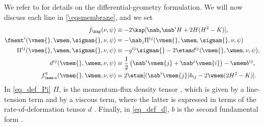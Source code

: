 We refer to \cite{desernoFluidLipidMembranes2015,worthmullerIRENEFluIdLayeR2025,marchiafavaAppuntiDiGeometria2005,arroyoRelaxationDynamicsFluid2009i} for details on the differential-geometry formulation.
We will now discuss each line in \cref{\eqsmembrane}, and we set
\bw
\begin{align}
        \label{eq_def_f_kap}
        f_\kap (\nu,\psi)                                         & \equiv  -2\kap [ \nab_i \nab^i H + 2 H (H^2-K)],                                    \\
        \label{eq_def_fmemt}
        \fmemt^i(\vmem{}, \wmem,\sigmam{},\nu,\psi)               & \equiv - \nab_j \Pi^{ij}(\vmem{}, \wmem,\sigmam{},\nu,\psi)                         \\
        \label{eq_def_Pi}
        \Pi^{ij}(\vmem{}, \wmem,\sigmam{},\nu,\psi)               & \equiv    -   g^{ij}\sigmam{} - 2 \etam d^{ij}(\vmem{}, \wmem,\nu,\psi) ,           \\
        \label{eq_def_d}
        d^{ij}(\vmem{}, \wmem,\nu,\psi)                           & \equiv  \frac{1}{2}\left( \nab^i \vmem{j}  + \nab^j \vmem{i}\right) - \wmem b^{ij}, \\
        \label{eq_def_f_eta_n}
        f^\eta_{\mem\, \text{n}}      (\vmem{}, \wmem, \nu, \psi) & \equiv
        2 \etam [ (\nab^i \vmem{j})b_{ij} - 2 \wmem (2 H^2 - K)                                                                 ]  .
\end{align}
\ew
In \cref{eq_def_Pi} $\Pi$, is the momentum-flux density tensor \cite{landauFluidMechanics1987}, which is given by a line-tension term and by a viscous term, where the latter is expressed in terms of the rate-of-deformation tensor $d$ \cite{al-izziShearDrivenInstabilitiesMembrane2020}. Finally, in \cref{eq_def_d}, $b$ is  the second fundamental form \cite{marchiafavaAppuntiDiGeometria2005,desernoNotesDifferentialGeometry2004}.
% 

